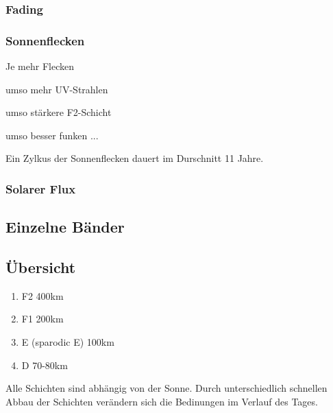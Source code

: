 \documentclass[fontzize=12pt,paper=a4,twoside=false]{article}
\begin{document}
    \subsubsection[]{Fading}
    \subsubsection[]{Sonnenflecken}
        Je mehr Flecken
        \begin{list}{}{}
            \item umso mehr UV-Strahlen 
            \item umso stärkere F2-Schicht
            \item umso besser funken ...
        \end{list}
        Ein Zylkus der Sonnenflecken dauert im Durschnitt 11 Jahre.
    \subsubsection[]{Solarer Flux}
    \subsection[]{Einzelne Bänder}

    \subsection[]{Übersicht}
    \begin{enumerate}
        \item F2 400km
        \item F1 200km
        \item E (sparodic E) 100km
        \item D 70-80km
    \end{enumerate}
    Alle Schichten sind abhängig von der Sonne. Durch unterschiedlich schnellen Abbau der Schichten verändern sich die Bedinungen im Verlauf des Tages.
\end{document}
